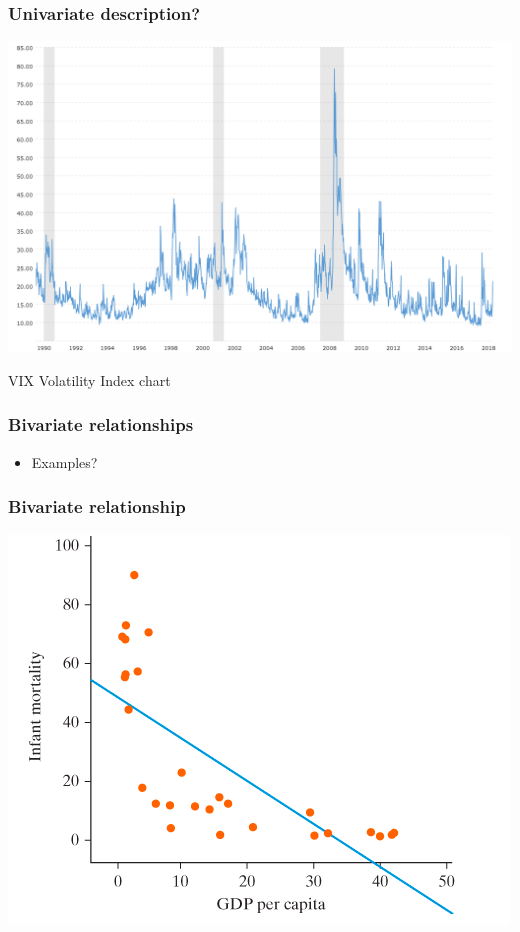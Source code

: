 \documentclass[aspectratio=43]{beamer}
\begin{document}
\begin{frame}
\frametitle{Univariate description?}
\centering

\includegraphics[width = \textwidth]{../img/vix-volatility-index-historical-chart}

VIX Volatility Index chart

\end{frame}

\begin{frame}
\frametitle{Bivariate relationships}
\centering

\begin{itemize}
  \item Examples?
\end{itemize}

\end{frame}

\begin{frame}
\frametitle{Bivariate relationship}
\centering

\includegraphics[width = \textwidth]{../img/scatter_GDP_mort}

\end{frame}
\end{document}
